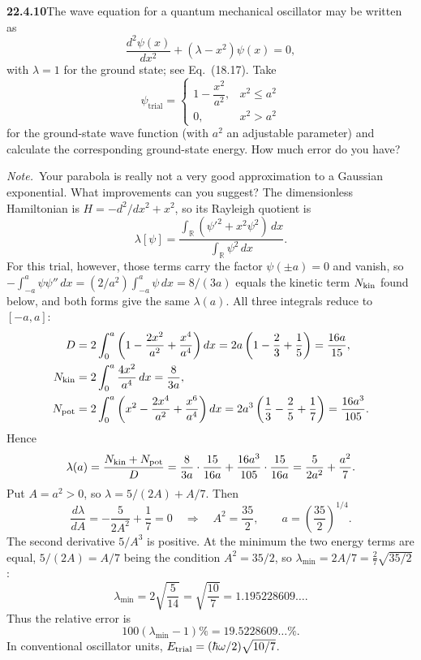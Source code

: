 \par\bigskip
\noindent\textbf{22.4.10}\quad The wave equation for a quantum
mechanical oscillator may be written as
\[
\frac{d^{2}\psi(x)}{dx^{2}}+(\lambda-x^{2})\psi(x)=0,
\]
with $\lambda=1$ for the ground state; see Eq.~(18.17). Take
\[
\psi_{\text{trial}}=\begin{cases}
1-\dfrac{x^{2}}{a^{2}}, & x^{2}\le a^{2}\\[8pt]
0, & x^{2}>a^{2}
\end{cases}
\]
for the ground-state wave function (with $a^{2}$ an adjustable
parameter) and calculate the corresponding ground-state energy.
How much error do you have?
\par\emph{Note.}~Your parabola is really not a very good
approximation to a Gaussian exponential. What improvements can
you suggest?
\solution
The dimensionless Hamiltonian is $H=-d^2/dx^2+x^2$, so its Rayleigh
quotient is
\[
 \lambda[\psi]
 =\frac{\int_{\mathbb R}(\psi'^2+x^2\psi^2)\,dx}
        {\int_{\mathbb R}\psi^2\,dx}.
\]
For this trial, however, those terms carry the factor $\psi(\pm a)=0$
and vanish, so $-\int_{-a}^{a}\psi\psi''\,dx
=(2/a^2)\int_{-a}^{a}\psi\,dx=8/(3a)$ equals the kinetic term
$N_{\rm kin}$ found below, and both forms give the same $\lambda(a)$.
All three integrals reduce to $[-a,a]$:
\begin{align*}
 D&=2\int_0^a\left(1-\frac{2x^2}{a^2}+\frac{x^4}{a^4}\right)dx
   =2a\left(1-\frac23+\frac15\right)=\frac{16a}{15},\\
 N_{\rm kin}&=2\int_0^a\frac{4x^2}{a^4}\,dx=\frac8{3a},\\
 N_{\rm pot}&=2\int_0^a
  \left(x^2-\frac{2x^4}{a^2}+\frac{x^6}{a^4}\right)dx
  =2a^3\left(\frac13-\frac25+\frac17\right)=\frac{16a^3}{105}.
\end{align*}
Hence
\[
 \lambda(a)=\frac{N_{\rm kin}+N_{\rm pot}}{D}
 =\frac8{3a}\cdot\frac{15}{16a}+\frac{16a^3}{105}\cdot\frac{15}{16a}
 =\frac5{2a^2}+\frac{a^2}{7}.
\]
Put $A=a^2>0$, so $\lambda=5/(2A)+A/7$.  Then
\[
 \frac{d\lambda}{dA}=-\frac5{2A^2}+\frac17=0
 \quad\Longrightarrow\quad
 A^2=\frac{35}{2},\qquad
 \boxed{a=\left(\frac{35}{2}\right)^{1/4}}.
\]
The second derivative $5/A^3$ is positive.  At the minimum the two
energy terms are equal, $5/(2A)=A/7$ being the condition $A^2=35/2$,
so $\lambda_{\min}=2A/7=\frac27\sqrt{35/2}$:
\[
 \boxed{\lambda_{\min}=2\sqrt{\frac5{14}}
       =\sqrt{\frac{10}{7}}=1.195228609\ldots}.
\]
Thus the relative error is
\[
 \boxed{100(\lambda_{\min}-1)\%=19.5228609\ldots\%}.
\]
In conventional oscillator units,
$E_{\rm trial}=(\hbar\omega/2)\sqrt{10/7}$.


